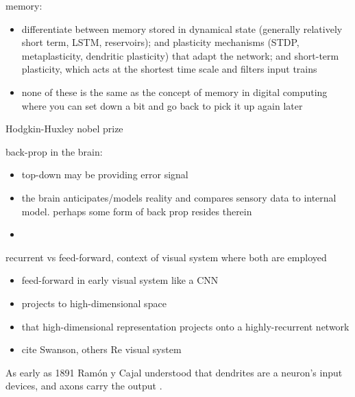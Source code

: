 \documentclass[twocolumn]{article}
\begin{document}
\vspace{3em}
memory: 
\begin{itemize}
\item differentiate between memory stored in dynamical state (generally relatively short term, LSTM, reservoirs); and plasticity mechanisms (STDP, metaplasticity, dendritic plasticity) that adapt the network; and short-term plasticity, which acts at the shortest time scale and filters input trains
\item none of these is the same as the concept of memory in digital computing where you can set down a bit and go back to pick it up again later
\end{itemize}

\vspace{3em}
Hodgkin-Huxley nobel prize

\vspace{3em}
back-prop in the brain:
\begin{itemize}
\item top-down may be providing error signal
\item the brain anticipates/models reality and compares sensory data to internal model. perhaps some form of back prop resides therein
\item \cite{scbe2017}
\end{itemize}

\vspace{3em}
recurrent vs feed-forward, context of visual system where both are employed
\begin{itemize}
\item feed-forward in early visual system like a CNN
\item projects to high-dimensional space
\item that high-dimensional representation projects onto a highly-recurrent network
\item cite Swanson, others Re visual system
\end{itemize}

\vspace{3em}
As early as 1891 Ram\'{o}n y Cajal understood that dendrites are a neuron's input devices, and axons carry the output \cite{hoko2006}.
\end{document}
